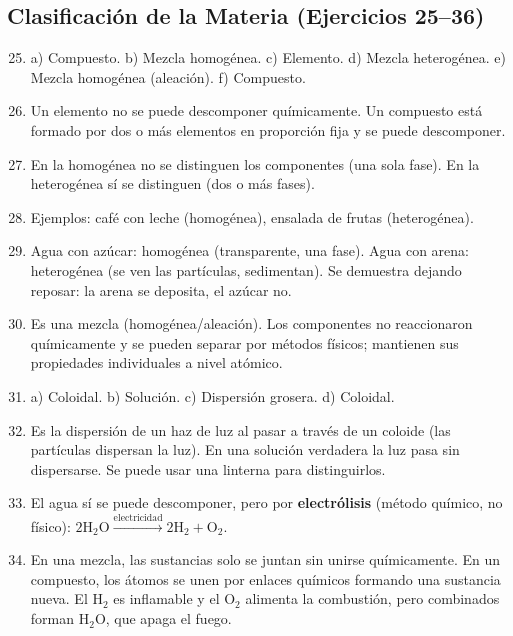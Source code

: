 \documentclass[12pt, letterpaper]{article}
\begin{document}
  \subsection*{Clasificación de la Materia (Ejercicios 25--36)}

  \begin{enumerate}[leftmargin=*, label=\textbf{\arabic*.}]
    \setcounter{enumi}{24}
    \item a) Compuesto. b) Mezcla homogénea. c) Elemento. d) Mezcla heterogénea. e) Mezcla homogénea (aleación). f) Compuesto.

    \item Un elemento no se puede descomponer químicamente. Un compuesto está formado por dos o más elementos en proporción fija y se puede descomponer.

    \item En la homogénea no se distinguen los componentes (una sola fase). En la heterogénea sí se distinguen (dos o más fases).

    \item Ejemplos: café con leche (homogénea), ensalada de frutas (heterogénea).

    \item Agua con azúcar: homogénea (transparente, una fase). Agua con arena: heterogénea (se ven las partículas, sedimentan). Se demuestra dejando reposar: la arena se deposita, el azúcar no.

    \item Es una mezcla (homogénea/aleación). Los componentes no reaccionaron químicamente y se pueden separar por métodos físicos; mantienen sus propiedades individuales a nivel atómico.

    \item a) Coloidal. b) Solución. c) Dispersión grosera. d) Coloidal.

    \item Es la dispersión de un haz de luz al pasar a través de un coloide (las partículas dispersan la luz). En una solución verdadera la luz pasa sin dispersarse. Se puede usar una linterna para distinguirlos.

    \item El agua sí se puede descomponer, pero por \textbf{electrólisis} (método químico, no físico): $2\text{H}_2\text{O} \xrightarrow{\text{electricidad}} 2\text{H}_2 + \text{O}_2$.

    \item En una mezcla, las sustancias solo se juntan sin unirse químicamente. En un compuesto, los átomos se unen por enlaces químicos formando una sustancia nueva. El H$_2$ es inflamable y el O$_2$ alimenta la combustión, pero combinados forman H$_2$O, que apaga el fuego.


\end{enumerate}
\end{document}
